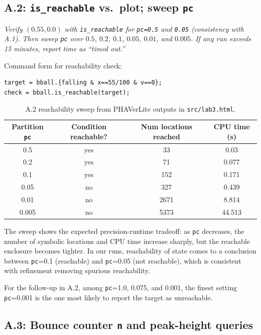 \documentclass[10pt]{article}
\newcommand{\afterprompt}{\par\medskip}
\begin{document}
\subsection*{A.2: \texttt{is\_reachable} vs.\ plot; sweep \texttt{pc}}
\textit{Verify $(0.55,0.0)$ with \texttt{is\_reachable} for \texttt{pc=0.5} and \texttt{0.05} (consistency with A.1).}
\textit{Then sweep \texttt{pc} over $0.5$, $0.2$, $0.1$, $0.05$, $0.01$, and $0.005$. If any run exceeds 15 minutes, report time as ``timed out.''}
\afterprompt
Command form for reachability check:
\begin{lstlisting}[style=phaver]
target = bball.{falling & x==55/100 & v==0};
check = bball.is_reachable(target);
\end{lstlisting}
\begin{table}[H]
\centering
\begin{tabular}{c c c c}
\toprule
Partition \texttt{pc} & Condition reachable? & Num locations reached & CPU time (\si{s}) \\
\midrule
0.5   & yes & 33   & 0.03 \\
0.2   & yes & 71   & 0.077 \\
0.1   & yes & 152  & 0.171 \\
0.05  & no  & 327  & 0.439 \\
0.01  & no  & 2671 & 8.814 \\
0.005 & no  & 5373 & 44.513 \\
\bottomrule
\end{tabular}
\caption{A.2 reachability sweep from PHAVerLite outputs in \texttt{src/lab3.html}.}
\label{tab:a2_pc_sweep}
\end{table}

\medskip
\noindent The sweep shows the expected precision-runtime tradeoff: as \texttt{pc} decreases, the number of symbolic locations and CPU time increase sharply, but the reachable enclosure becomes tighter. In our runs, reachability of state comes to a conclusion between \texttt{pc}=0.1 (reachable) and \texttt{pc}=0.05 (not reachable), which is consistent with refinement removing spurious reachability.

\noindent For the follow-up in A.2, among \texttt{pc}=1.0, 0.075, and 0.001, the finest setting \texttt{pc}=0.001 is the one most likely to report the target as unreachable.

\subsection*{A.3: Bounce counter \texttt{n} and peak-height queries}
\end{document}
